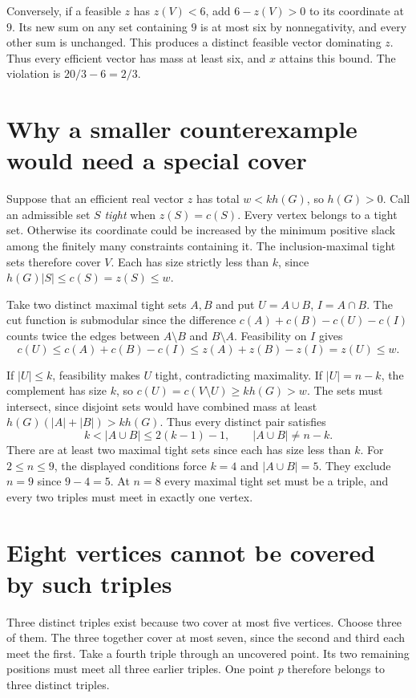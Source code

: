 \documentclass[11pt,a4paper]{article}
\newcommand{\cut}{c}
\begin{document}
Conversely, if a feasible \(z\) has \(z(V)<6\), add \(6-z(V)>0\) to its
coordinate at \(9\). Its new sum on any set containing \(9\) is at most six
by nonnegativity, and every other sum is unchanged. This produces a distinct
feasible vector dominating \(z\). Thus every efficient vector has mass at
least six, and \(x\) attains this bound. The violation is \(20/3-6=2/3\).

\section*{Why a smaller counterexample would need a special cover}
Suppose that an efficient real vector \(z\) has total \(w<kh(G)\), so
\(h(G)>0\). Call an admissible set \(S\) \emph{tight} when \(z(S)=\cut(S)\).
Every vertex belongs to a tight set. Otherwise its coordinate could be
increased by the minimum positive slack among the finitely many
constraints containing it. The inclusion-maximal tight sets therefore
cover \(V\). Each has size strictly less than \(k\), since
\(h(G)|S|\le\cut(S)=z(S)\le w\).

Take two distinct maximal tight sets \(A,B\) and put \(U=A\cup B\),
\(I=A\cap B\). The cut function is submodular since the difference
\(\cut(A)+\cut(B)-\cut(U)-\cut(I)\) counts twice the edges between
\(A\setminus B\) and \(B\setminus A\). Feasibility on \(I\) gives
\[
  \cut(U)\le\cut(A)+\cut(B)-\cut(I)
       \le z(A)+z(B)-z(I)=z(U)\le w.
\]

\newpage
\noindent
If \(|U|\le k\), feasibility makes \(U\) tight, contradicting maximality.
If \(|U|=n-k\), the complement has size \(k\), so
\(\cut(U)=\cut(V\setminus U)\ge kh(G)>w\). The sets must intersect,
since disjoint sets would have combined mass at least
\(h(G)(|A|+|B|)>kh(G)\). Thus every distinct pair satisfies
\[
 k<|A\cup B|\le 2(k-1)-1,\qquad |A\cup B|\ne n-k.
\]
There are at least two maximal tight sets since each has size less than \(k\).
For \(2\le n\le9\), the displayed conditions force \(k=4\) and
\(|A\cup B|=5\). They exclude \(n=9\) since \(9-4=5\). At \(n=8\)
every maximal tight set must be a triple, and every two triples must meet
in exactly one vertex.

\section*{Eight vertices cannot be covered by such triples}
Three distinct triples exist because two cover at most five vertices.
Choose three of them.
The three together cover at most seven, since the second and third
each meet the first. Take a fourth triple through an uncovered point.
Its two remaining positions must meet all three earlier triples.
One point \(p\) therefore belongs to three distinct triples.
\end{document}
